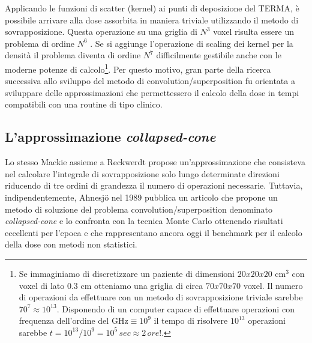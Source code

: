 {Applicando le funzioni di scatter (kernel) ai punti di deposizione del TERMA, è possibile arrivare alla dose assorbita in maniera triviale utilizzando il metodo di sovrapposizione. Questa operazione su una griglia di $N^3$ voxel risulta essere un problema  di ordine $N^6$ \cite{Ahnesjo1999}. Se si aggiunge l'operazione di scaling dei kernel per la densità il problema diventa di ordine $N^7$ difficilmente gestibile anche con le moderne potenze di calcolo\footnote{Se immaginiamo di discretizzare un paziente di dimensioni $20x20x20$ cm$^3$ con voxel di lato $0.3$ cm otteniamo una griglia di circa $70x70x70$ voxel. Il numero di operazioni da effettuare con un metodo di sovrapposizione triviale sarebbe $70^7\approx 10^{13}$. Disponendo di un computer capace di effettuare operazioni con frequenza dell'ordine del GHz$\equiv 10^9$ il tempo di risolvere $10^{13}$ operazioni sarebbe $t=10^{13}/10^9=10^5\,sec\approx 2\, ore!$.}. Per questo motivo, gran parte della ricerca successiva allo sviluppo del metodo di convolution/superposition fu orientata a sviluppare delle approssimazioni che permettessero il calcolo della dose in tempi compatibili con una routine di tipo clinico.

\subsection{L'approssimazione \textit{collapsed-cone}}
Lo stesso Mackie assieme a Reckwerdt \cite{Reckwerdt1992} propose un'approssimazione che consisteva nel calcolare l'integrale di sovrapposizione solo lungo determinate direzioni riducendo di tre ordini di grandezza il numero di operazioni necessarie. Tuttavia, indipendentemente, Ahnesj\"{o} nel 1989 pubblica un articolo \cite{Ahnesjo1989} che propone un metodo di soluzione del problema convolution/superposition denominato \textit{collapsed-cone} e lo confronta con la tecnica Monte Carlo ottenendo risultati eccellenti per l'epoca e che rappresentano ancora oggi il benchmark per il calcolo della dose con metodi non statistici.

}

